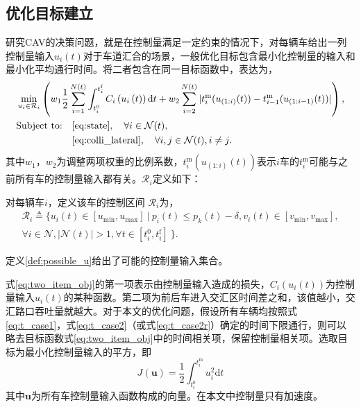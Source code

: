 \subsection{优化目标建立}
研究CAV的决策问题，就是在控制量满足一定约束的情况下，对每辆车给出一列控制量输入$u_i(t)$对于车道汇合的场景，一般优化目标包含最小化控制量的输入和最小化平均通行时间。\cite{Rios2016Automated}将二者包含在同一目标函数中，表达为，
\begin{equation}
\begin{aligned}
&\min_{u_i\in \mathcal{R}_i}\left(w_1\frac12\sum^{N(t)}_{i=1}\int_{t_i^0}^{t_i^\mathrm{f}}C_i\left(u_i\left(t\right)\right)\mathrm{d}t + w_2\sum_{i=2}^{N(t)}|t_i^\mathrm{m}(u_{(1:i)}(t))-t_{i-1}^\mathrm{m}(u_{(1:i-1)}(t))|\right),\\
&
\begin{aligned}
\text{Subject to:} & \quad \mbox{\eqref{eq:state}}, \quad \forall i\in \mathcal{N}(t),\\
& \quad \mbox{\eqref{eq:colli_lateral}}, \quad \forall i,j \in \mathcal{N}(t), i\neq j.
\end{aligned}
\end{aligned}
\label{eq:two_item_obj}
\end{equation}
其中$w_1$，$w_2$为调整两项权重的比例系数，$t_i^\mathrm{m}(u_{(1:i)}(t))$表示$i$车的$t_i^\mathrm{m}$可能与之前所有车的控制量输入都有关。$\mathcal{R}_i$定义如下：
\begin{definition}[控制区间]
对每辆车$i$，定义该车的{\heiti 控制区间} $\mathcal{R}_i$为，
\begin{equation}
\begin{gathered}
\mathcal{R}_i\triangleq\{u_i(t)\in[u_{\min}, u_{\max}]\ |\ p_i(t)\leq p_k(t)-\delta, v_i(t)\in[v_{\min}, v_{\max}],\\
\forall i \in \mathcal{N}, |\mathcal{N}(t)|>1, \forall t \in [t_i^0, t_i^\mathrm{f}]\ \}.
\end{gathered}
\end{equation}
\label{def:possible_u}
\end{definition}
定义\ref{def:possible_u}给出了可能的控制量输入集合。

式\eqref{eq:two_item_obj}的第一项表示由控制量输入造成的损失，$C_i(u_i(t))$为控制量输入$u_i(t)$的某种函数。第二项为前后车进入交汇区时间差之和，该值越小，交汇路口吞吐量就越大。对于本文的优化问题，假设所有车辆均按照式\eqref{eq:t_case1}，式\eqref{eq:t_case2}（或式\eqref{eq:t_case2r}）确定的时间下限通行，则可以略去目标函数式\eqref{eq:two_item_obj}中的时间相关项，保留控制量相关项。选取目标为最小化控制量输入的平方\cite{Malikopoulos2016A,Rios2016Automated}，即
\begin{equation}
J(\bm{u})=\frac12\int_{t_i^0}^{t_i^\mathrm{m}}u_i^2\mathrm{d}t
\label{eq:one_item_obj}
\end{equation}
其中$\bm{u}$为所有车控制量输入函数构成的向量。在本文中控制量只有加速度。